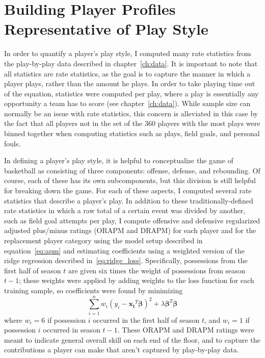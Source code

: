 \section{Building Player Profiles Representative of Play Style}
\label{sec:profiles}

In order to quantify a player's play style, I computed many rate statistics from the
play-by-play data described in chapter~\ref{ch:data}. It is important to note that
all statistics are rate statistics, as the goal is to capture the manner in which a
player plays, rather than the amount he plays. In order to take playing time out of
the equation, statistics were computed per play, where a play is essentially any
opportunity a team has to score (see chapter~\ref{ch:data}). While sample size can
normally be an issue with rate statistics, this concern is alleviated in this case
by the fact that all players not in the set of the 360 players with the most plays
were binned together when computing statistics such as plays, field goals, and
personal fouls.

In defining a player's play style, it is helpful to conceptualize the game of
basketball as consisting of three components: offense, defense, and rebounding.  Of
course, each of these has its own subcomponents, but this division is still helpful
for breaking down the game. For each of these aspects, I computed several rate
statistics that describe a player's play. In addition to these traditionally-defined
rate statistics in which a raw total of a certain event was divided by another, such
as field goal attempts per play, I compute offensive and defensive regularized
adjusted plus/minus ratings (ORAPM and DRAPM) for each player and for the
replacement player category using the model setup described in equation~\ref{eq:apm}
and estimating coefficients using a weighted version of the ridge regression
described in~\ref{eq:ridge_loss}. Specifically, possessions from the first half of
season $t$ are given six times the weight of possessions from season $t-1$; these
weights were applied by adding weights to the loss function for each training
sample, so coefficients were found by minimizing
\begin{equation} \label{eq:weighted_ridge_loss}
    \sum_{i=1}^n w_i \left( y_i - \bm{x_i}^T\bm{\beta} \right)^2 + \lambda
    \bm{\beta}^T\bm{\beta}
\end{equation}
where $w_i = 6$ if possession $i$ occurred in the first half of season $t$, and
$w_i = 1$ if possession $i$ occurred in season $t-1$. These ORAPM and DRAPM ratings
were meant to indicate general overall skill on each end of the floor, and to
capture the contributions a player can make that aren't captured by play-by-play
data.

